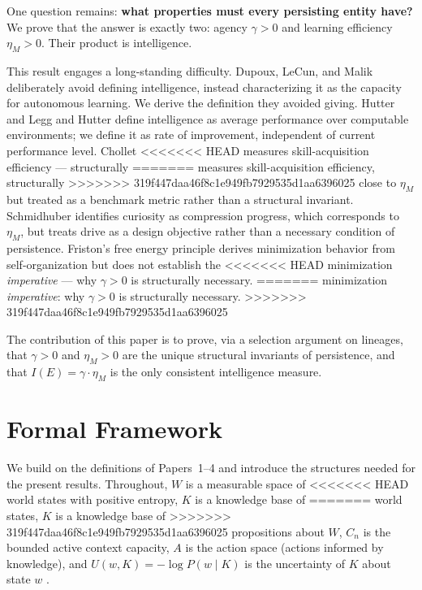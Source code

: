 \documentclass[11pt]{article}
\theoremstyle{definition}
\theoremstyle{remark}
\begin{document}
One question remains: \textbf{what properties must every persisting
entity have?} We prove that the answer is exactly two: agency $\gamma > 0$
and learning efficiency $\eta_M > 0$. Their product is intelligence.

This result engages a long-standing difficulty. Dupoux, LeCun, and Malik
\cite{DupouxLeCunMalik2026} deliberately avoid defining intelligence,
instead characterizing it as the capacity for autonomous learning. We
derive the definition they avoided giving. Hutter \cite{Hutter2005} and
Legg and Hutter \cite{LeggHutter2007} define intelligence as average
performance over computable environments; we define it as rate of
improvement, independent of current performance level. Chollet
<<<<<<< HEAD
\cite{Chollet2019} measures skill-acquisition efficiency --- structurally
=======
\cite{Chollet2019} measures skill-acquisition efficiency, structurally
>>>>>>> 319f447daa46f8c1e949fb7929535d1aa6396025
close to $\eta_M$ but treated as a benchmark metric rather than a
structural invariant. Schmidhuber \cite{Schmidhuber2010} identifies
curiosity as compression progress, which corresponds to $\eta_M$, but
treats drive as a design objective rather than a necessary condition of
persistence. Friston's free energy principle \cite{Friston2010} derives
minimization behavior from self-organization but does not establish the
<<<<<<< HEAD
minimization \emph{imperative} --- why $\gamma > 0$ is structurally necessary.
=======
minimization \emph{imperative}: why $\gamma > 0$ is structurally necessary.
>>>>>>> 319f447daa46f8c1e949fb7929535d1aa6396025

The contribution of this paper is to prove, via a selection argument on
lineages, that $\gamma > 0$ and $\eta_M > 0$ are the unique structural
invariants of persistence, and that $I(E) = \gamma \cdot \eta_M$ is the only
consistent intelligence measure.

\section{Formal Framework}
\label{sec:framework}

We build on the definitions of Papers~1--4 and introduce the structures
needed for the present results. Throughout, $W$ is a measurable space of
<<<<<<< HEAD
world states with positive entropy, $K$ is a knowledge base of
=======
world states, $K$ is a knowledge base of
>>>>>>> 319f447daa46f8c1e949fb7929535d1aa6396025
propositions about $W$, $C_n$ is the bounded active context capacity,
$A$ is the action space (actions informed by knowledge), and $U(w,K) =
-\log P(w \mid K)$ is the uncertainty of $K$ about state $w$
\cite{Shannon1948, Cover2006}.
\end{document}
